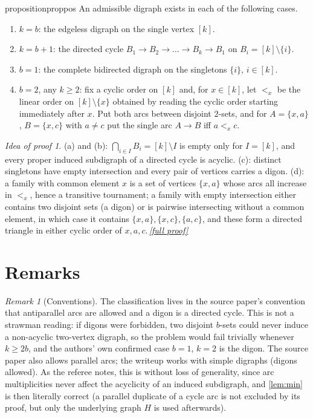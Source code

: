 \documentclass[11pt,a4paper]{article}
\theoremstyle{plain}
\theoremstyle{definition}
\theoremstyle{remark}
\newtheorem{remark}[theorem]{Remark}
\newtheorem*{proofidea}{Idea of proof}
\newcommand{\fullproofref}[1]{\,\hyperref[#1]{\textit{[full proof]}}}
\begin{document}
\begin{restatable}{proposition}{proppos}\label{prop:pos}
An admissible digraph exists in each of the following cases.
\begin{enumerate}[label=(\alph*),nosep]
\item $k=b$: the edgeless digraph on the single vertex $[k]$.
\item $k=b+1$: the directed cycle $B_1\to B_2\to\dots\to B_k\to B_1$ on $B_i=[k]\setminus\{i\}$.
\item $b=1$: the complete bidirected digraph on the singletons $\{i\}$, $i\in[k]$.
\item $b=2$, any $k\ge2$: fix a cyclic order on $[k]$ and, for $x\in[k]$, let $<_x$ be the linear order on $[k]\setminus\{x\}$ obtained by reading the cyclic order starting immediately after $x$. Put both arcs between disjoint $2$-sets, and for $A=\{x,a\}$, $B=\{x,c\}$ with $a\ne c$ put the single arc $A\to B$ iff $a<_x c$.
\end{enumerate}
\end{restatable}
\begin{proofidea}
(a) and (b): $\bigcap_{i\in I}B_i=[k]\setminus I$ is empty only for $I=[k]$, and every proper induced subdigraph of a directed cycle is acyclic. (c): distinct singletons have empty intersection and every pair of vertices carries a digon. (d): a family with common element $x$ is a set of vertices $\{x,a\}$ whose arcs all increase in $<_x$, hence a transitive tournament; a family with empty intersection either contains two disjoint sets (a digon) or is pairwise intersecting without a common element, in which case it contains $\{x,a\},\{x,c\},\{a,c\}$, and these form a directed triangle in either cyclic order of $x,a,c$.\fullproofref{pf:pos}
\end{proofidea}

\section{Remarks}

\begin{remark}[Conventions]
The classification lives in the source paper's convention that antiparallel arcs are allowed and a digon is a directed cycle. This is not a strawman reading: if digons were forbidden, two disjoint $b$-sets could never induce a non-acyclic two-vertex digraph, so the problem would fail trivially whenever $k\ge2b$, and the authors' own confirmed case $b=1$, $k=2$ is the digon. The source paper also allows parallel arcs; the writeup works with simple digraphs (digons allowed). As the referee notes, this is without loss of generality, since arc multiplicities never affect the acyclicity of an induced subdigraph, and \cref{lem:min} is then literally correct (a parallel duplicate of a cycle arc is not excluded by its proof, but only the underlying graph $H$ is used afterwards).
\end{remark}
\end{document}
